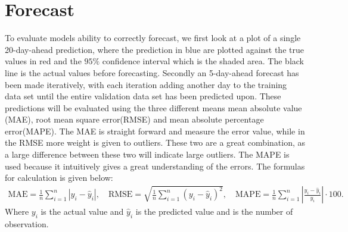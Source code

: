 \section{Forecast}
To evaluate models ability to correctly forecast, we first look at a plot of a single 20-day-ahead prediction, where the prediction in blue are plotted against the true values in red and the $95\%$ confidence interval which is the shaded area. The black line is the actual values before forecasting. Secondly an 5-day-ahead forecast has been made iteratively, with each iteration adding another day to the training data set until the entire validation data set has been predicted upon. These predictions will be evaluated using the three different means mean absolute value (MAE), root mean square error(RMSE) and mean absolute percentage error(MAPE). The MAE is straight forward and measure the error value, while in the RMSE more weight is given to outliers. These two are a great combination, as a large difference between these two will indicate large outliers. The MAPE is used because it intuitively gives a great understanding of the errors. The formulas for calculation is given below:
\begin{align*}
    \text{MAE} = \frac{1}{n} \sum_{i=1}^{n} |y_i - \hat{y}_i|, \quad \text{RMSE} = \sqrt{\frac{1}{n} \sum_{i=1}^{n} (y_i - \hat{y}_i)^2}, \quad \text{MAPE} = \frac{1}{n} \sum_{i=1}^{n} \left| \frac{y_i - \hat{y}_i}{y_i} \right|\cdot 100.
\end{align*}
\noindent Where $y_i$ is the actual value and $\hat{y}_i$ is the predicted value and is the number of observation.

